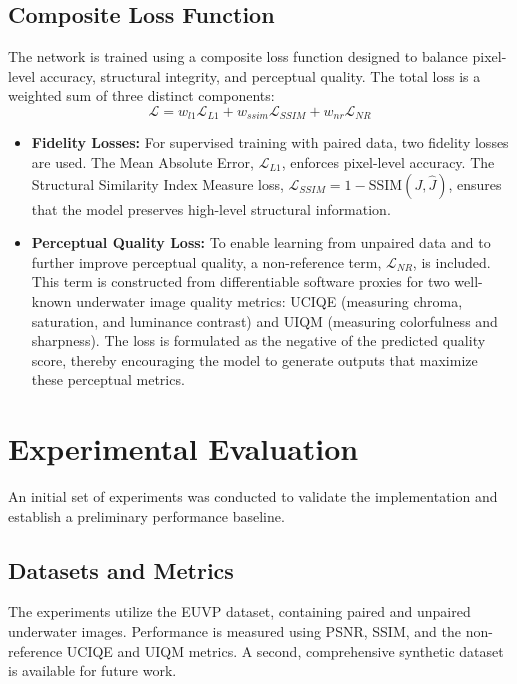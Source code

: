\documentclass[10pt,twocolumn,letterpaper]{article}
\begin{document}
\subsection{Composite Loss Function}
The network is trained using a composite loss function designed to balance pixel-level accuracy, structural integrity, and perceptual quality. The total loss is a weighted sum of three distinct components:
\begin{equation}
    \mathcal{L} = w_{l1}\mathcal{L}_{L1} + w_{ssim}\mathcal{L}_{SSIM} + w_{nr}\mathcal{L}_{NR}
\end{equation}
\begin{itemize}
    \item \textbf{Fidelity Losses:} For supervised training with paired data, two fidelity losses are used. The Mean Absolute Error, $\mathcal{L}_{L1}$, enforces pixel-level accuracy. The Structural Similarity Index Measure loss, $\mathcal{L}_{SSIM} = 1 - \text{SSIM}(J, \hat{J})$, ensures that the model preserves high-level structural information.
    \item \textbf{Perceptual Quality Loss:} To enable learning from unpaired data and to further improve perceptual quality, a non-reference term, $\mathcal{L}_{NR}$, is included. This term is constructed from differentiable software proxies for two well-known underwater image quality metrics: UCIQE (measuring chroma, saturation, and luminance contrast) and UIQM (measuring colorfulness and sharpness). The loss is formulated as the negative of the predicted quality score, thereby encouraging the model to generate outputs that maximize these perceptual metrics.
\end{itemize}

\section{Experimental Evaluation}
An initial set of experiments was conducted to validate the implementation and establish a preliminary performance baseline.

\subsection{Datasets and Metrics}
The experiments utilize the EUVP dataset, containing paired and unpaired underwater images. Performance is measured using PSNR, SSIM, and the non-reference UCIQE and UIQM metrics. A second, comprehensive synthetic dataset is available for future work.
\end{document}
